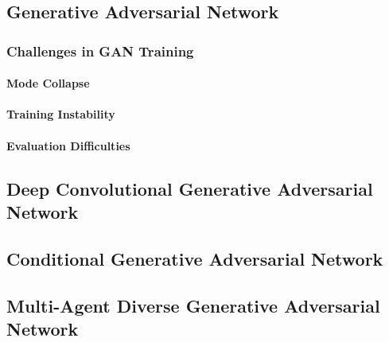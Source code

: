 \subsection[Generative Adversarial Network - GAN]{Generative Adversarial Network}\label{theoretical_gan}
\subsubsection{Challenges in GAN Training}
\paragraph[Mode Collapse]{Mode Collapse}
\paragraph[Training Instability]{Training Instability}
\paragraph[Evaluation Difficulties]{Evaluation Difficulties}

\subsection[Deep Convolutional Generative Adversarial Network - DCGAN]{Deep Convolutional Generative Adversarial Network}\label{theoretical_dcgan}

\subsection[Conditional Generative Adversarial Network - cGAN]{Conditional Generative Adversarial Network}\label{theoretical_cgan}

\subsection[Multi-Agent Diverse Generative Adversarial Network - MADGAN]{Multi-Agent Diverse Generative Adversarial Network}\label{theoretical_madgan}





